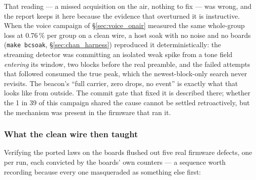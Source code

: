 That reading --- a missed acquisition on the air, nothing to fix --- was
wrong, and the report keeps it here because the evidence that
overturned it is instructive.  When the voice campaign of
\S\ref{sec:voice_onair} measured the same whole-group loss at
0.76\,\% per group on a clean wire, a host soak with no noise and no
boards (\texttt{make bcsoak}, \S\ref{sec:chan_harness}) reproduced it
deterministically: the streaming detector was committing an isolated
weak spike from a tone field \emph{entering} its window, two blocks
before the real preamble, and the failed attempts that followed
consumed the true peak, which the newest-block-only search never
revisits.  The beacon's ``full carrier, zero drops, no event'' is
exactly what that looks like from outside.  The commit gate that fixed
it is described there; whether the 1 in 39 of this campaign shared the
cause cannot be settled retroactively, but the mechanism was present
in the firmware that ran it.

\subsubsection{What the clean wire then taught}

Verifying the ported laws on the boards flushed out five real
firmware defects, one per run, each convicted by the boards' own
counters --- a sequence worth recording because every one masqueraded
as something else first:

